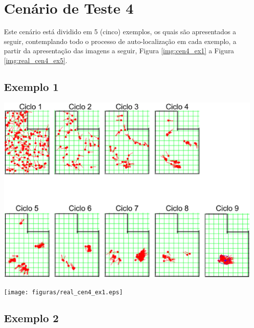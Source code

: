 \section{Cenário de Teste 4}

Este cenário está dividido em 5 (cinco) exemplos, os quais são apresentados a seguir, contemplando todo o processo de auto-localização
em cada exemplo, a partir da apresentação das imagens a seguir, Figura \ref{img:cen4_ex1} a Figura \ref{img:real_cen4_ex5}.

\subsection{Exemplo 1}

{\centering
\includegraphics[scale=0.4]{figuras/cen4_ex1.eps}
\label{img:cen4_ex1}
\par}

{\centering
\texttt{[image: figuras/real\_cen4\_ex1.eps]}
\label{img:real_cen4_ex1}
\par}

\subsection{Exemplo 2}

